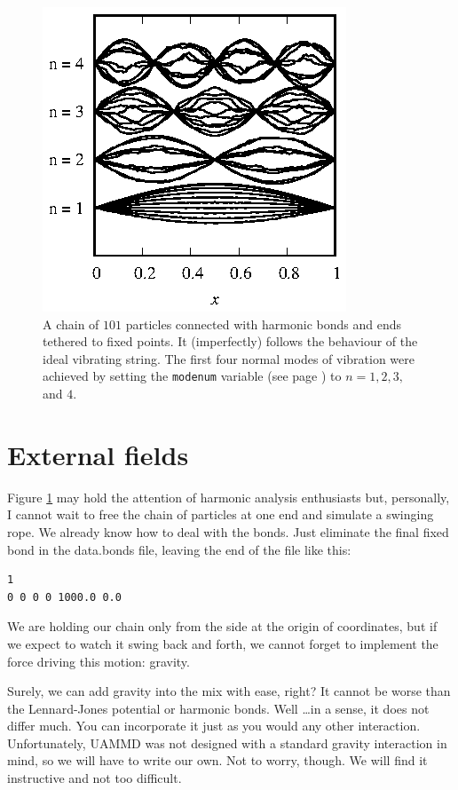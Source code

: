 \begin{figure}
  \centering
  \includegraphics[width = 0.6 \textwidth]{figures/vibratingString.eps}
  \caption{\label{vibratingString}A chain of $101$ particles connected with
           harmonic bonds and ends tethered to fixed points. It (imperfectly)
           follows the behaviour of the ideal vibrating string. The first four
           normal modes of vibration were achieved by setting the
           \texttt{modenum} variable (see page
           \pageref{stringInitialConditions}) to $n = 1, 2, 3,$ and $4$.}
\end{figure}

\section{External fields}

Figure \ref{vibratingString} may hold the attention of harmonic analysis
enthusiasts but, personally, I cannot wait to free the chain of particles at one
end and simulate a swinging rope. We already know how to deal with the bonds.
Just eliminate the final fixed bond in the data.bonds file, leaving the end of
the file like this:
\begin{lstlisting}
1
0 0 0 0 1000.0 0.0
\end{lstlisting}

We are holding our chain only from the side at the origin of coordinates, but if
we expect to watch it swing back and forth, we cannot forget to implement the
force driving this motion: gravity.

Surely, we can add gravity into the mix with ease, right? It cannot be worse
than the Lennard-Jones potential or harmonic bonds. Well \ldots in a sense, it
does not differ much. You can incorporate it just as you would any other
interaction. Unfortunately, UAMMD was not designed with a standard gravity
interaction in mind, so we will have to write our own. Not to worry, though. We
will find it instructive and not too difficult.

